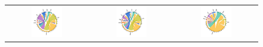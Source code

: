 \documentclass[a4paper]{article}
\begin{document}
\begin{figure}[h!]
{\begin{tabular}{ccc}
\includegraphics[width=0.4\textwidth, trim= {1.3cm 0.8cm 1.1cm 1cm}, clip]{"EM_MIG_AGR_2010_19_ROW.pdf"} & \includegraphics[width=0.4\textwidth, trim= {1.3cm 0.8cm 1.1cm 1cm}, clip]{"EM_MIG_FBE_2010_19_ROW.pdf"} &
\includegraphics[width=0.4\textwidth, trim= {1.3cm 0.8cm 1.1cm 1cm}, clip]{"EM_MIG_MAN_2010_19_ROW.pdf"} \\
\end{tabular}
}
\end{figure}
\FloatBarrier
\end{document}
